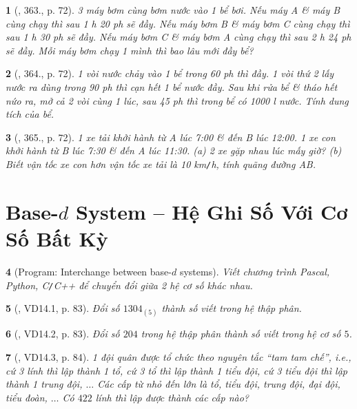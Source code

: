 \documentclass{article}
\newtheorem{baitoan}{}
\begin{document}
\begin{baitoan}[\cite{Tuyen_Toan_6}, 363., p. 72]
	3 máy bơm cùng bơm nước vào 1 bể bơi. Nếu máy A \& máy B cùng chạy thì sau {\rm1 h 20 ph} sẽ đầy. Nếu máy bơm B \& máy bơm C cùng chạy thì sau {\rm1 h 30 ph} sẽ đầy. Nếu máy bơm C \& máy bơm A cùng chạy thì sau {\rm2 h 24 ph} sẽ đầy. Mỗi máy bơm chạy 1 mình thì bao lâu mới đầy bể?
\end{baitoan}

\begin{baitoan}[\cite{Tuyen_Toan_6}, 364., p. 72]
	1 vòi nước chảy vào 1 bể trong {\rm60 ph} thì đầy. 1 vòi thứ 2 lấy nước ra dùng trong {\rm90 ph} thì cạn hết 1 bể nước đầy. Sau khi rửa bể \& tháo hết nứo ra, mở cả 2 vòi cùng 1 lúc, sau {\rm45 ph} thì trong bể có {\rm1000 l} nước. Tính dung tích của bể.
\end{baitoan}

\begin{baitoan}[\cite{Tuyen_Toan_6}, 365., p. 72]
	1 xe tải khởi hành từ A lúc {\rm7:00} \& đến B lúc {\rm12:00}. 1 xe con khởi hành từ B lúc {\rm7:30} \& đến A lúc {\rm11:30}. (a) 2 xe gặp nhau lúc mấy giờ? (b) Biết vận tốc xe con hơn vận tốc xe tải là {\rm10 km{\tt/}h}, tính quãng đường AB.
\end{baitoan}


\section{Base-$d$ System -- Hệ Ghi Số Với Cơ Số Bất Kỳ}

\begin{baitoan}[{\sf Program}: Interchange between base-$d$ systems]
	Viết chương trình {\sf Pascal, Python, C{\tt/}C++} để chuyển đổi giữa 2 hệ cơ số khác nhau.
\end{baitoan}

\begin{baitoan}[\cite{TLCT_THCS_Toan_6_so_hoc}, VD14.1, p. 83]
	Đổi số $1304_{(5)}$ thành số viết trong hệ thập phân.
\end{baitoan}

\begin{baitoan}[\cite{TLCT_THCS_Toan_6_so_hoc}, VD14.2, p. 83]
	Đổi số $204$ trong hệ thập phân thành số viết trong hệ cơ số $5$.
\end{baitoan}

\begin{baitoan}[\cite{TLCT_THCS_Toan_6_so_hoc}, VD14.3, p. 84]
	1 đội quân được tổ chức theo nguyên tắc ``tam tam chế'', i.e., cứ 3 lính thì lập thành 1 tổ, cứ 3 tổ thì lập thành 1 tiểu đội, cứ 3 tiểu đội thì lập thành 1 trung đội, $\ldots$ Các cấp từ nhỏ đến lớn là tổ, tiểu đội, trung đội, đại đội, tiểu đoàn, $\ldots$ Có $422$ lính thì lập được thành các cấp nào?
\end{baitoan}
\end{document}
